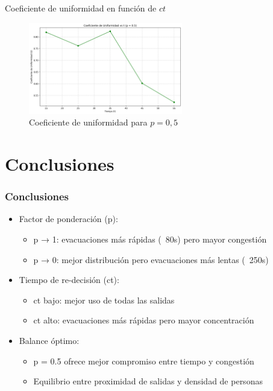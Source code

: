 \documentclass[aspectratio=169]{beamer}
\begin{document}
\begin{frame}{Coeficiente de uniformidad en función de $ct$}
    \begin{figure}[H]
        \centering
        \includegraphics[width=0.6\textwidth]{img/uniformity_vs_t_p0.5.png}
        \caption{Coeficiente de uniformidad para $p=0,5$}
        \label{fig:flow_p100}
    \end{figure}    
\end{frame}


\section{Conclusiones}

\begin{frame}
    \frametitle{Conclusiones}
    
    \begin{itemize}
        \item Factor de ponderación (p):
        \begin{itemize}
            \item p → 1: evacuaciones más rápidas (~80s) pero mayor congestión
            \item p → 0: mejor distribución pero evacuaciones más lentas (~250s)
        \end{itemize}
        \item Tiempo de re-decisión (ct):
        \begin{itemize}
            \item ct bajo: mejor uso de todas las salidas
            \item ct alto: evacuaciones más rápidas pero mayor concentración
        \end{itemize}
        \item Balance óptimo:
        \begin{itemize}
            \item p = 0.5 ofrece mejor compromiso entre tiempo y congestión
            \item Equilibrio entre proximidad de salidas y densidad de personas
        \end{itemize}
    \end{itemize}    
\end{frame}
\end{document}
